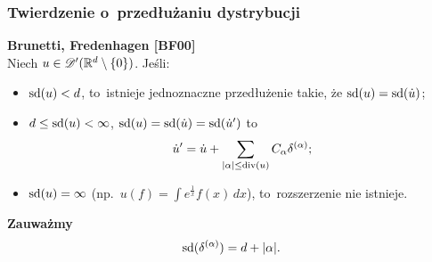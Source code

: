 \documentclass[10pt,t]{beamer}
\begin{document}
\begin{frame}
  \frametitle{Twierdzenie o~przedłużaniu dystrybucji}


  \textbf{Brunetti, Fredenhagen [BF00]} \\
  Niech $u \in \mathcal{D}'( \mathbb{R}^{ d } \setminus \{ 0 \} )$. Jeśli:
  \begin{itemize}

  \item $\textrm{sd}( u ) < d$, to~istnieje jednoznaczne przedłużenie
    takie, że $\textrm{sd}( u ) = \textrm{sd}( \dot{ u } )$;

  \item $d \leq \textrm{sd}( u ) < \infty$,
    $\textrm{sd}( u ) = \textrm{sd}( \dot{ u } ) = \textrm{sd}( \dot{ u }' )$ to
    \begin{equation}
      \label{eq:Epstein-Glaser-04}
      \dot{ u }' =
      \dot{ u } + \sum\limits_{ | \alpha | \leq \textrm{div}( u ) } C_{ \alpha } \delta^{ ( \alpha ) };
    \end{equation}

  \item $\textrm{sd}( u ) = \infty$
    (np.~$u( f ) = \int e^{ \frac{ 1 }{ x } } f( x ) \, dx$),
    to~rozszerzenie nie istnieje.

  \end{itemize}

  \vspace{\spaceFour}



  \textbf{Zauważmy}
  \begin{equation}
    \label{eq:Epstein-Glaser-05}
    \textrm{sd}( \delta^{ ( \alpha ) } ) = d + | \alpha |.
  \end{equation}

\end{frame}
\end{document}
